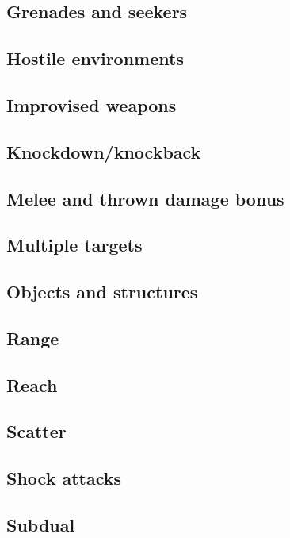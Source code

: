 \subsection{Grenades and seekers}

\subsection{Hostile environments}

\subsection{Improvised weapons}

\subsection{Knockdown/knockback}

\subsection{Melee and thrown damage bonus}

\subsection{Multiple targets}

\subsection{Objects and structures}

\subsection{Range}

\subsection{Reach}

\subsection{Scatter}

\subsection{Shock attacks}

\subsection{Subdual}

